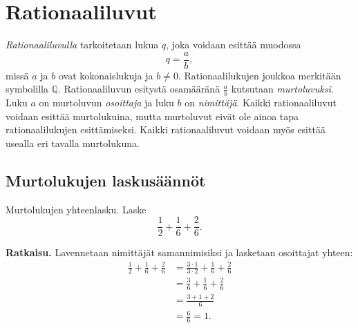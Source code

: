 \chapter{Rationaaliluvut}
    \label{rationaaliluvut}
    
    \emph{Rationaaliluvulla} tarkoitetaan lukua $q$, joka voidaan esittää muodossa
    \[
    q=\frac{a}{b}, 
    \]
    missä $a$ ja $b$ ovat kokonaislukuja ja $b\neq 0$. Rationaalilukujen joukkoa
    merkitään symbolilla $\mathbb{Q}$. Rationaaliluvun esitystä osamääränä
    $\frac{a}{b}$ kutsutaan \emph{murtoluvuksi}. Luku $a$ on murtoluvun
    \emph{osoittaja} ja luku $b$ on \emph{nimittäjä}. Kaikki rationaaliluvut
    voidaan esittää murtolukuina, mutta murtoluvut eivät ole ainoa tapa
    rationaalilukujen esittämiseksi. Kaikki rationaaliluvut voidaan myös
    esittää usealla eri tavalla murtolukuna.

\section{Murtolukujen laskusäännöt}

\begin{esimerkki}
        Murtolukujen yhteenlasku. Laske
        \[
        \frac{1}{2} + \frac{1}{6} + \frac{2}{6}.
        \]
        
        \textbf{Ratkaisu.}
        Lavennetaan nimittäjät samannimisiksi ja lasketaan osoittajat yhteen:
        \begin{align*}
            \frac{1}{2} + \frac{1}{6} + \frac{2}{6}
            &=
            \frac{3\cdot 1}{3\cdot 2} + \frac{1}{6} + \frac{2}{6}\\
            &=
            \frac{3}{6} + \frac{1}{6} + \frac{2}{6}\\
            &= \frac{3+1+2}{6}\\ &= \frac{6}{6} = 1.
        \end{align*}
    \end{esimerkki}


